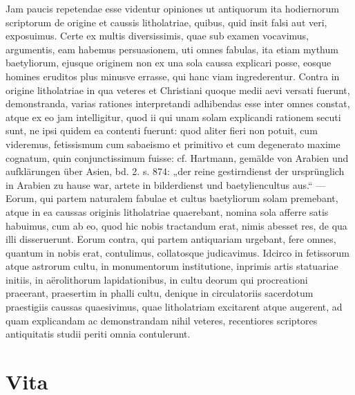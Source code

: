 \documentclass[a4paper, 11pt, oneside, polutonikogreek, german]{article}
\begin{document}
Jam paucis repetendae esse videntur opiniones ut antiquorum ita hodiernorum scriptorum de origine et caussis litholatriae, quibus, quid insit falsi aut veri, exposuimus. Certe ex multis diversissimis, quae sub examen vocavimus, argumentis, eam habemus persuasionem, uti omnes fabulas, ita etiam mythum baetyliorum, ejusque originem non ex una sola caussa explicari posse, eosque homines eruditos plus minusve errasse, qui hanc viam ingrederentur. Contra in origine litholatriae in qua veteres et Christiani quoque medii aevi versati fuerunt, demonstranda, varias rationes interpretandi adhibendas esse inter omnes constat, atque ex eo jam intelligitur, quod ii qui unam solam explicandi rationem secuti sunt, ne ipsi quidem ea contenti fuerunt: quod aliter fieri non potuit, cum videremus, fetissismum cum sabaeismo et primitivo et cum degenerato maxime cognatum, quin conjunctissimum fuisse: cf. Hartmann, gemälde von Arabien und aufklärungen über Asien, bd. 2. s. 874: „der reine gestirndienst der ursprünglich in Arabien zu hause war, artete in bilderdienst und baetyliencultus aus.“ --- Eorum, qui partem naturalem fabulae et cultus baetyliorum solam premebant, atque in ea caussas originis litholatriae quaerebant, nomina sola afferre satis habuimus, cum ab eo, quod hic nobis tractandum erat, nimis abesset res, de qua illi disseruerunt. Eorum contra, qui partem antiquariam urgebant, fere omnes, quantum in nobis erat, contulimus, collatosque judicavimus. Idcirco in fetissorum atque astrorum cultu, in monumentorum institutione, inprimis artis statuariae initiis, in aërolithorum lapidationibus, in cultu deorum qui procreationi praeerant, praesertim in phalli cultu, denique in circulatoriis sacerdotum praestigiis caussas quaesivimus, quae litholatriam excitarent atque augerent, ad quam explicandam ac demonstrandam nihil veteres, recentiores scriptores antiquitatis studii periti omnia contulerunt.
\clearpage
\section*{Vita}
\end{document}

